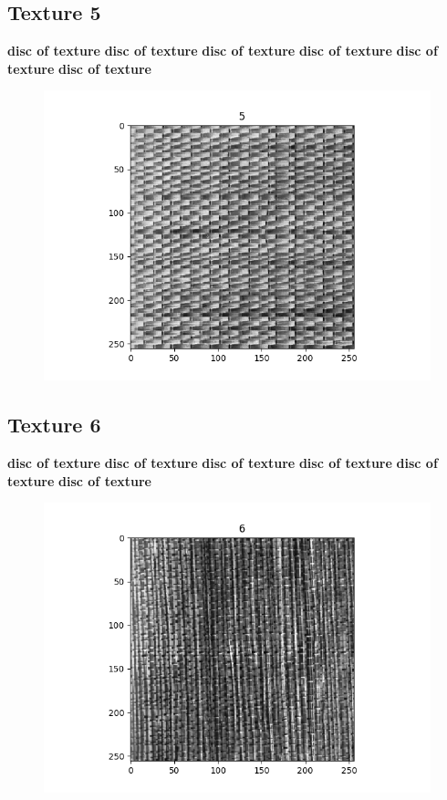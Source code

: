 \documentclass{article}
\begin{document}
\subsection{Texture 5}
\textbf{disc of texture}
\textbf{disc of texture}
\textbf{disc of texture}
\textbf{disc of texture}
\textbf{disc of texture}
\textbf{disc of texture}
\begin{figure}[h!]
\includegraphics[scale=0.5]{5.png}
\end{figure}

\subsection{Texture 6}
\textbf{disc of texture}
\textbf{disc of texture}
\textbf{disc of texture}
\textbf{disc of texture}
\textbf{disc of texture}
\textbf{disc of texture}
\begin{figure}[h!]
\includegraphics[scale=0.5]{6.png}
\end{figure}
\end{document}
